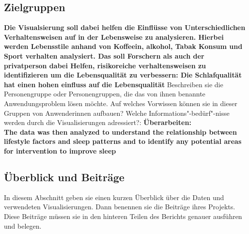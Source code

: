 \documentclass[usegeometry=true]{scrartcl}
\begin{document}
\subsection{Zielgruppen}
\textbf{Die Visualsierung soll dabei helfen die Einflüsse von Unterschiedlichen Verhaltensweisen auf in der Lebensweise zu analysieren. Hierbei werden Lebensstile anhand von Koffeein, alkohol, Tabak Konsum und Sport verhalten analysiert. Das  soll Forschern als auch der privatperson dabei Helfen, risikoreiche verhaltensweisen zu identifizieren um die Lebensqualität zu verbessern: Die Schlafqualität hat einen hohen einfluss auf die Lebensqualität }
Beschreiben sie die Personengruppe oder Personengruppen, die das von ihnen benannte Anwendungsproblem lösen möchte.
 Auf welches Vorwissen können sie in dieser Gruppen von Anwenderinnen aufbauen? 
 Welche Informations"-bedürf"-nisse werden durch die Visualisierungen adressiert?:
\textbf{Überarbeiten: \\ The data was then analyzed to understand the relationship between lifestyle factors 
  and sleep patterns and to identify any potential areas for intervention to improve sleep \\}
\subsection{Überblick und Beiträge}
In diesem Abschnitt geben sie einen kurzen Überblick über die Daten und verwendeten Visualisierungen. Dann benennen sie die Beiträge ihres Projekts. Diese Beiträge müssen sie in den hinteren Teilen des Berichts genauer ausführen und belegen.
\end{document}
